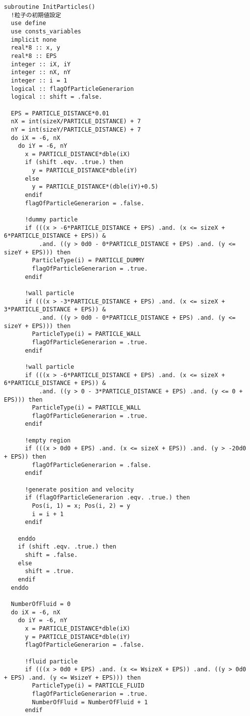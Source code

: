 \begin{lstlisting}[caption=粒子初期化ルーチン]
subroutine InitParticles()
  !粒子の初期値設定
  use define
  use consts_variables
  implicit none
  real*8 :: x, y
  real*8 :: EPS
  integer :: iX, iY
  integer :: nX, nY
  integer :: i = 1
  logical :: flagOfParticleGenerarion
  logical :: shift = .false.

  EPS = PARTICLE_DISTANCE*0.01
  nX = int(sizeX/PARTICLE_DISTANCE) + 7
  nY = int(sizeY/PARTICLE_DISTANCE) + 7
  do iX = -6, nX
    do iY = -6, nY
      x = PARTICLE_DISTANCE*dble(iX)
      if (shift .eqv. .true.) then
        y = PARTICLE_DISTANCE*dble(iY)
      else
        y = PARTICLE_DISTANCE*(dble(iY)+0.5)
      endif
      flagOfParticleGenerarion = .false.

      !dummy particle
      if (((x > -6*PARTICLE_DISTANCE + EPS) .and. (x <= sizeX + 6*PARTICLE_DISTANCE + EPS)) &
          .and. ((y > 0d0 - 0*PARTICLE_DISTANCE + EPS) .and. (y <= sizeY + EPS))) then
        ParticleType(i) = PARTICLE_DUMMY
        flagOfParticleGenerarion = .true.
      endif

      !wall particle
      if (((x > -3*PARTICLE_DISTANCE + EPS) .and. (x <= sizeX + 3*PARTICLE_DISTANCE + EPS)) &
          .and. ((y > 0d0 - 0*PARTICLE_DISTANCE + EPS) .and. (y <= sizeY + EPS))) then
        ParticleType(i) = PARTICLE_WALL
        flagOfParticleGenerarion = .true.
      endif

      !wall particle
      if (((x > -6*PARTICLE_DISTANCE + EPS) .and. (x <= sizeX + 6*PARTICLE_DISTANCE + EPS)) &
          .and. ((y > 0 - 3*PARTICLE_DISTANCE + EPS) .and. (y <= 0 + EPS))) then
        ParticleType(i) = PARTICLE_WALL
        flagOfParticleGenerarion = .true.
      endif

      !empty region
      if (((x > 0d0 + EPS) .and. (x <= sizeX + EPS)) .and. (y > -20d0 + EPS)) then
        flagOfParticleGenerarion = .false.
      endif

      !generate position and velocity
      if (flagOfParticleGenerarion .eqv. .true.) then
        Pos(i, 1) = x; Pos(i, 2) = y
        i = i + 1
      endif
      
    enddo
    if (shift .eqv. .true.) then
      shift = .false.
    else
      shift = .true.
    endif
  enddo

  NumberOfFluid = 0
  do iX = -6, nX
    do iY = -6, nY
      x = PARTICLE_DISTANCE*dble(iX)
      y = PARTICLE_DISTANCE*dble(iY)
      flagOfParticleGenerarion = .false.

      !fluid particle
      if (((x > 0d0 + EPS) .and. (x <= WsizeX + EPS)) .and. ((y > 0d0 + EPS) .and. (y <= WsizeY + EPS))) then
        ParticleType(i) = PARTICLE_FLUID
        flagOfParticleGenerarion = .true.
        NumberOfFluid = NumberOfFluid + 1
      endif


\end{lstlisting}
